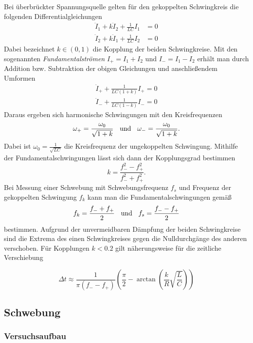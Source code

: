 Bei überbrückter Spannungsquelle gelten für den gekoppelten Schwingkreis die folgenden Differentialgleichungen 
\begin{align*}
\ddot I_1 + k \ddot I_2 + \frac{1}{LC}I_1 &= 0 \\
\ddot I_2 + k \ddot I_1 + \frac{1}{LC}I_2 &= 0
\end{align*}
Dabei bezeichnet $k \in (0,1)$ die Kopplung der beiden Schwingkreise. 
Mit den sogenannten \textit{Fundamentalströmen} $I_+ = I_1 + I_2$ und $I_- = I_1 - I_2$ erhält man durch Addition bzw. Subtraktion der obigen Gleichungen und anschließendem Umformen
\begin{align*}
\ddot I_+ + \frac{1}{LC(1+k)} I_+ = 0 \\
\ddot I_- + \frac{1}{LC(1-k)} I_- = 0
\end{align*}
Daraus ergeben sich harmonische Schwingungen mit den Kreisfrequenzen 
$$\omega_+ = \frac{\omega_0}{\sqrt{1+k}} \hspace{0.2cm} \text{ und } \hspace{0.2cm} \omega_- = \frac{\omega_0}{\sqrt{1+k}}.$$
Dabei ist $\omega_0 = \frac{1}{\sqrt{LC}}$ die Kreisfrequenz der ungekoppelten Schwingung. Mithilfe der Fundamentalschwingungen lässt sich dann der Kopplungsgrad bestimmen
$$k = \frac{f_-^2 - f_+^2}{f_-^2 + f_+^2}.$$
Bei Messung einer Schwebung mit Schwebungsfrequenz $f_s$ und Frequenz der gekoppelten Schwingung $f_k$ kann man die Fundamentalschwingungen gemäß
$$f_k = \frac{f_- + f_+}{2} \hspace{0.2cm} \text{ und } \hspace{0.2cm} f_s = \frac{f_- - f_+}{2}$$
bestimmen. Aufgrund der unvermeidbaren Dämpfung der beiden Schwingkreise sind die Extrema des einen Schwingkreises gegen die Nulldurchgänge des anderen verschoben. Für Kopplungen $k < 0.2$ gilt näherungsweise für die zeitliche Verschiebung

\begin{equation}\label{eq:delta_t}
\Delta t \approx \frac{1}{\pi(f_--f_+)} \left( \frac{\pi}{2} - \arctan\left(  \frac kR \sqrt{\frac LC}\right) \right)
\end{equation}



\subsection{Schwebung}


\subsubsection{Versuchsaufbau}

